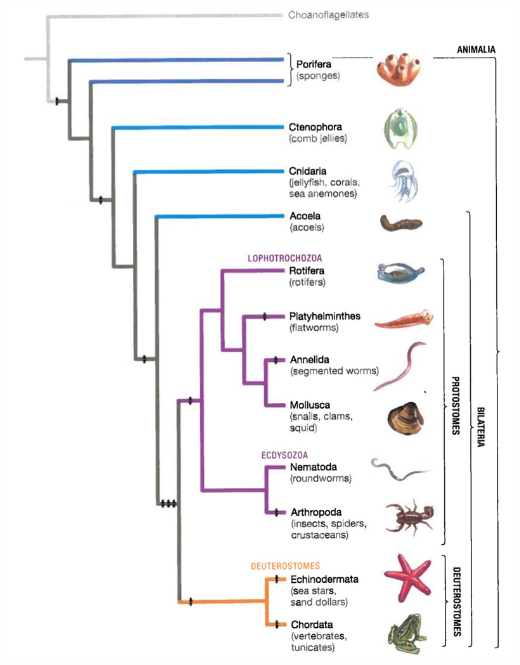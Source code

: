 \begin{frame}
\begin{adjustwidth}{-2em}{-1.5em}
\begin{columns}[t]
            \vspace{-2mm}
            \includegraphics[height=\textheight]{animal-phylogeny-masked.png}

        \end{columns}
    \end{adjustwidth}
\end{frame}

